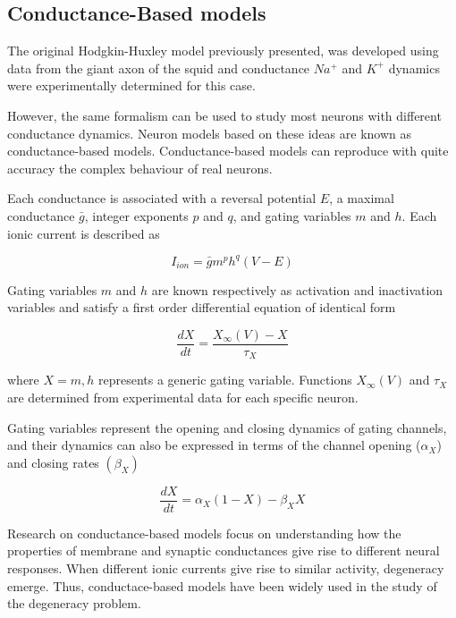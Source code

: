 \subsection{Conductance-Based models}
The original Hodgkin-Huxley model previously presented, was developed using data from the giant axon of the squid and conductance $Na^{+}$ and $K^{+}$ dynamics were experimentally determined for this case.

However, the same formalism can be used to study most neurons with different conductance dynamics. Neuron models based on these ideas are known as conductance-based models. Conductance-based models can reproduce with quite accuracy the complex behaviour of real neurons.

Each conductance is associated with a reversal potential $E$, a maximal conductance $\bar{g}$, integer exponents $p$ and $q$, and gating variables $m$ and $h$. Each ionic current is described as

\begin{equation}
    I_{ion} = \bar{g}m^{p}h^{q}(V-E)
\end{equation}

Gating variables $m$ and $h$ are known respectively as activation and inactivation variables and satisfy a first order differential equation of identical form

\begin{equation}
    \frac{dX}{dt} = \frac{X_{\infty}(V)-X}{\tau_{X}}
\end{equation}

where $X = m,h$ represents a generic gating variable. Functions $X_{\infty}(V)$ and $\tau_{X}$ are determined from experimental data for each specific neuron.

Gating variables represent the opening and closing dynamics of gating channels, and their dynamics can also be expressed in terms of the channel opening ($\alpha_{X}$) and closing rates $(\beta_{X})$

\begin{equation}
    \frac{dX}{dt} = \alpha_{X}(1-X) - \beta_{X}X
\end{equation}

Research on conductance-based models focus on understanding how the properties of membrane and synaptic conductances give rise to different neural responses. When different ionic currents give rise to similar activity, degeneracy emerge. Thus, conductace-based models have been widely used in the study of the degeneracy problem.

